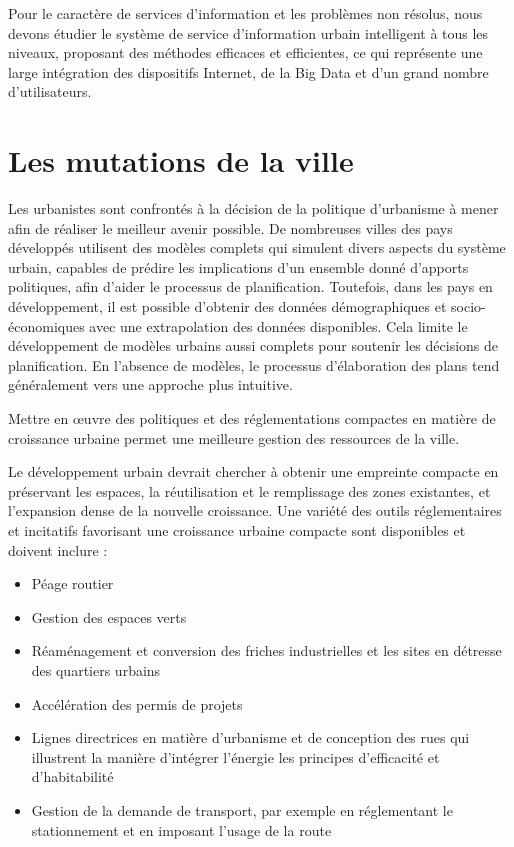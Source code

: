 Pour le caractère de services d'information et les problèmes non résolus,
nous devons étudier le système de service d'information urbain intelligent à tous les niveaux,
proposant des méthodes efficaces et efficientes, ce qui représente une large intégration des
dispositifs Internet, de la Big Data et d'un grand nombre d'utilisateurs.

\section{Les mutations de la ville}

Les urbanistes sont confrontés à la décision de la politique d'urbanisme à mener afin de réaliser le meilleur avenir possible.
De nombreuses villes des pays développés utilisent des modèles complets qui simulent divers aspects du système urbain,
capables de prédire les implications d'un ensemble donné d'apports politiques, afin d'aider le processus de planification.
Toutefois, dans les pays en développement, il est possible d'obtenir des données démographiques et socio-économiques
avec une extrapolation des données disponibles.
Cela limite le développement de modèles urbains aussi complets pour soutenir les décisions de planification.
En l'absence de modèles, le processus d'élaboration des plans tend généralement vers une approche plus intuitive.

Mettre en œuvre des politiques et des réglementations compactes en matière de croissance urbaine
permet une meilleure gestion des ressources de la ville.

Le développement urbain devrait chercher à obtenir une empreinte compacte en préservant les
espaces, la réutilisation et le remplissage des zones existantes, et l'expansion dense de la nouvelle croissance.
Une variété des outils réglementaires et incitatifs favorisant une croissance urbaine compacte sont disponibles
et doivent inclure :

\begin{itemize}
    \item Péage routier
    \item Gestion des espaces verts
    \item Réaménagement et conversion des friches industrielles et les sites en détresse des quartiers urbains
    \item Accélération des permis de projets
    \item Lignes directrices en matière d'urbanisme et de conception des rues qui illustrent la manière d'intégrer l'énergie
    les principes d'efficacité et d'habitabilité
    \item Gestion de la demande de transport, par exemple en réglementant le stationnement et en imposant l'usage de la route
\end{itemize}

